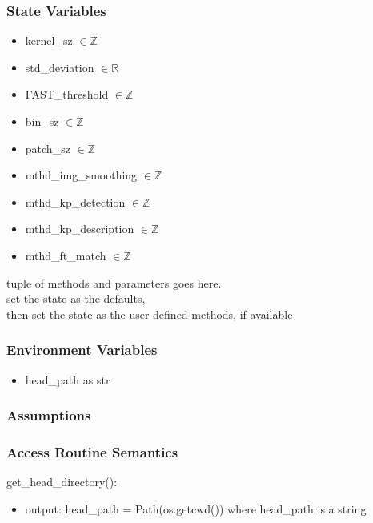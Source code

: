\documentclass[12pt, titlepage]{article}
\begin{document}
\subsubsection{State Variables}
\begin{itemize}
  \item kernel\_sz $ \in \mathbb{Z}$
  \item std\_deviation $ \in \mathbb{R}$
  \item FAST\_threshold $ \in \mathbb{Z}$
  \item bin\_sz $ \in \mathbb{Z}$
  \item patch\_sz $ \in \mathbb{Z}$
  \item mthd\_img\_smoothing $ \in \mathbb{Z}$
  \item mthd\_kp\_detection $ \in \mathbb{Z}$
  \item mthd\_kp\_description $ \in \mathbb{Z}$
  \item mthd\_ft\_match $ \in \mathbb{Z}$
\end{itemize}

tuple of methods and parameters goes here.\\
set the state as the defaults, \\
then set the state as the user defined methods, if available


\subsubsection{Environment Variables}
\begin{itemize}
  \item head\_path as str
\end{itemize}

\subsubsection{Assumptions}


\subsubsection{Access Routine Semantics}
\noindent get\_head\_directory():
\begin{itemize}
  \item output: head\_path = Path(os.getcwd()) where head\_path is a string
\end{itemize}
\end{document}

